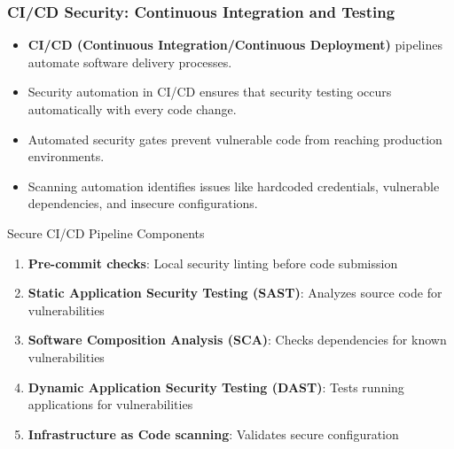 \documentclass{beamer}
\begin{document}
\begin{frame}
  \frametitle{CI/CD Security: Continuous Integration and Testing}
  
  \begin{itemize}
    \item \textbf{CI/CD (Continuous Integration/Continuous Deployment)} pipelines automate software delivery processes.
    \item Security automation in CI/CD ensures that security testing occurs automatically with every code change.
    \item Automated security gates prevent vulnerable code from reaching production environments.
    \item Scanning automation identifies issues like hardcoded credentials, vulnerable dependencies, and insecure configurations.
  \end{itemize}
  
  \begin{block}{Secure CI/CD Pipeline Components}
    \scriptsize
    \begin{enumerate}
      \item \textbf{Pre-commit checks}: Local security linting before code submission
      \item \textbf{Static Application Security Testing (SAST)}: Analyzes source code for vulnerabilities
      \item \textbf{Software Composition Analysis (SCA)}: Checks dependencies for known vulnerabilities
      \item \textbf{Dynamic Application Security Testing (DAST)}: Tests running applications for vulnerabilities
      \item \textbf{Infrastructure as Code scanning}: Validates secure configuration
    \end{enumerate}
  \end{block}
\end{frame}
\end{document}
